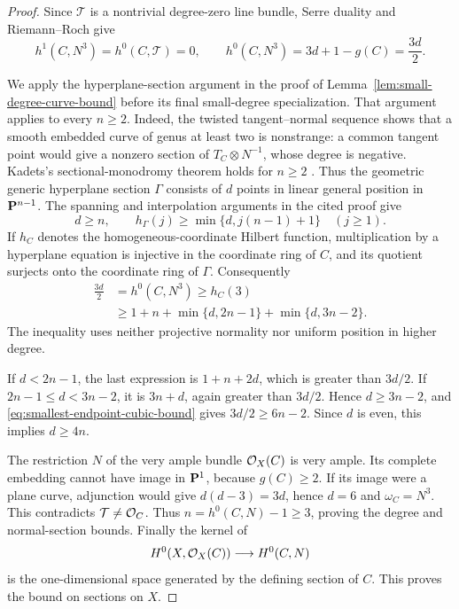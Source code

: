\begin{proof}
Since $\mathcal T$ is a nontrivial degree-zero line bundle, Serre
duality and Riemann--Roch give
\begin{equation}\label{eq:smallest-endpoint-cubic-dimension}
 h^1(C,N^3)=h^0(C,\mathcal T)=0,\qquad
 h^0(C,N^3)=3d+1-g(C)=\frac{3d}{2}.
\end{equation}

We apply the hyperplane-section argument in the proof of
Lemma~\ref{lem:small-degree-curve-bound} before its final
small-degree specialization.  That argument applies to every
$n\ge2$.  Indeed, the twisted tangent--normal sequence shows that a
smooth embedded curve of genus at least two is nonstrange: a common
tangent point would give a nonzero section of $T_C\otimes N^{-1}$,
whose degree is negative.  Kadets's sectional-monodromy theorem
holds for $n\ge2$
\cite[Proposition~2.8 and proof, pp.~4--5]{Kadets}.
Thus the geometric generic hyperplane section $\Gamma$ consists
of $d$ points in linear general position in $\mathbf P^{n-1}$.
The spanning and interpolation arguments in the cited proof give
\[
 d\ge n,\qquad
 h_\Gamma(j)\ge\min\{d,j(n-1)+1\}\quad(j\ge1).
\]
If $h_C$ denotes the homogeneous-coordinate Hilbert function,
multiplication by a hyperplane equation is injective in the
coordinate ring of $C$, and its quotient surjects onto the
coordinate ring of $\Gamma$.  Consequently
\begin{equation}\label{eq:smallest-endpoint-cubic-bound}
 \begin{split}
 \frac{3d}{2}
 &=h^0(C,N^3)\ge h_C(3)\\
 &\ge 1+n+\min\{d,2n-1\}+\min\{d,3n-2\}.
 \end{split}
\end{equation}
The inequality uses neither projective normality nor uniform
position in higher degree.

If $d<2n-1$, the last expression is $1+n+2d$, which is greater
than $3d/2$.  If $2n-1\le d<3n-2$, it is $3n+d$, again greater
than $3d/2$.  Hence $d\ge3n-2$, and
\eqref{eq:smallest-endpoint-cubic-bound} gives
$3d/2\ge6n-2$.  Since $d$ is even, this implies $d\ge4n$.

The restriction $N$ of the very ample bundle $\mathcal O_X(C)$ is very
ample.  Its complete embedding cannot have image in $\mathbf P^1$,
because $g(C)\ge2$.  If its image were a plane curve, adjunction
would give $d(d-3)=3d$, hence $d=6$ and $\omega_C=N^3$.
This contradicts $\mathcal T\ne\mathcal O_C$.
Thus $n=h^0(C,N)-1\ge3$, proving the degree and normal-section
bounds.  Finally the kernel of
\[
 H^0(X,\mathcal O_X(C))\longrightarrow H^0(C,N)
\]
is the one-dimensional space generated by the defining section
of $C$.  This proves the bound on sections on $X$.
\end{proof}

